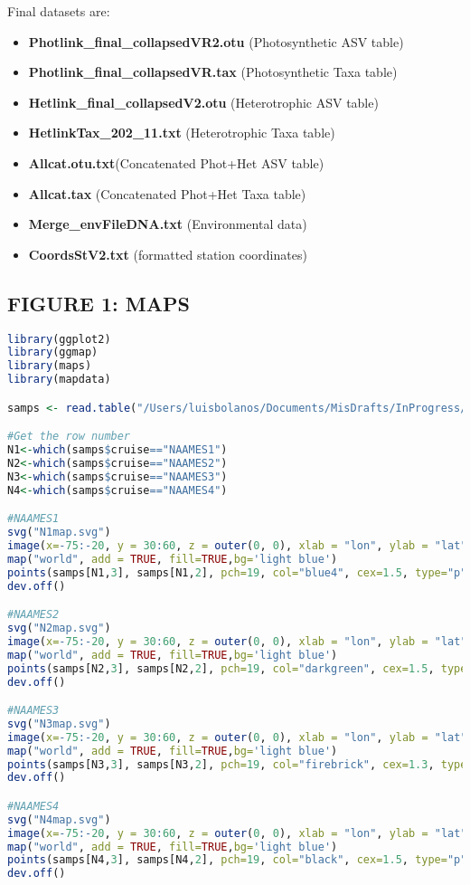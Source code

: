 \documentclass{article}
\begin{document}
Final datasets are:
\begin{itemize}
\item {\bfseries Photlink\_final\_collapsedVR2.otu} (Photosynthetic ASV table)
\item {\bfseries Photlink\_final\_collapsedVR.tax} (Photosynthetic Taxa table)
\item {\bfseries Hetlink\_final\_collapsedV2.otu} (Heterotrophic ASV table) 
\item {\bfseries HetlinkTax\_202\_11.txt} (Heterotrophic Taxa table)
\item {\bfseries Allcat.otu.txt}(Concatenated Phot+Het ASV table)
\item {\bfseries Allcat.tax} (Concatenated Phot+Het Taxa table)
\item {\bfseries Merge\_envFileDNA.txt} (Environmental data)
\item {\bfseries CoordsStV2.txt} (formatted station coordinates)
\end{itemize}

\subsection{FIGURE 1: MAPS}
\begin{lstlisting}[language=R]
library(ggplot2)
library(ggmap)
library(maps)
library(mapdata)

samps <- read.table("/Users/luisbolanos/Documents/MisDrafts/InProgress/NAAMES_annual/CoordsStV2.txt", header=T,sep="\t")

#Get the row number
N1<-which(samps$cruise=="NAAMES1")
N2<-which(samps$cruise=="NAAMES2")
N3<-which(samps$cruise=="NAAMES3")
N4<-which(samps$cruise=="NAAMES4")

#NAAMES1
svg("N1map.svg")
image(x=-75:-20, y = 30:60, z = outer(0, 0), xlab = "lon", ylab = "lat")
map("world", add = TRUE, fill=TRUE,bg='light blue')
points(samps[N1,3], samps[N1,2], pch=19, col="blue4", cex=1.5, type="p")
dev.off()

#NAAMES2
svg("N2map.svg")
image(x=-75:-20, y = 30:60, z = outer(0, 0), xlab = "lon", ylab = "lat")
map("world", add = TRUE, fill=TRUE,bg='light blue')
points(samps[N2,3], samps[N2,2], pch=19, col="darkgreen", cex=1.5, type="p")
dev.off()

#NAAMES3
svg("N3map.svg")
image(x=-75:-20, y = 30:60, z = outer(0, 0), xlab = "lon", ylab = "lat")
map("world", add = TRUE, fill=TRUE,bg='light blue')
points(samps[N3,3], samps[N3,2], pch=19, col="firebrick", cex=1.3, type="p")
dev.off()

#NAAMES4
svg("N4map.svg")
image(x=-75:-20, y = 30:60, z = outer(0, 0), xlab = "lon", ylab = "lat")
map("world", add = TRUE, fill=TRUE,bg='light blue')
points(samps[N4,3], samps[N4,2], pch=19, col="black", cex=1.5, type="p")
dev.off()
\end{lstlisting}
\end{document}
